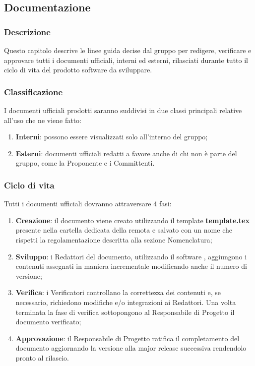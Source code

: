 \subsection{Documentazione}

	\subsubsection{Descrizione}
	Questo capitolo descrive le linee guida decise dal gruppo per redigere, verificare e approvare tutti i documenti ufficiali, interni ed esterni, rilasciati durante tutto il ciclo di vita del prodotto software da sviluppare.

	\subsubsection{Classificazione}
	I documenti ufficiali prodotti saranno suddivisi in due classi principali relative all'uso che ne viene fatto:
	\begin{enumerate}
		\item \textbf{Interni}: possono essere visualizzati solo all'interno del gruppo;
		\item \textbf{Esterni}: documenti ufficiali redatti a favore anche di chi non è parte del gruppo, come la Proponente e i Committenti.
	\end{enumerate}

	\subsubsection{Ciclo di vita}
	Tutti i documenti ufficiali dovranno attraversare 4 fasi:
	\begin{enumerate}
		\item \textbf{Creazione}: il documento viene creato utilizzando il template \textbf{template.tex} presente nella cartella dedicata della  remota e salvato con un nome che rispetti la regolamentazione descritta alla sezione Nomenclatura;
		\item \textbf{Sviluppo}: i Redattori del documento, utilizzando il software , aggiungono i contenuti assegnati in maniera incrementale modificando anche il numero di versione;
		\item \textbf{Verifica}: i Verificatori controllano la correttezza dei contenuti e, se necessario, richiedono modifiche e/o integrazioni ai Redattori. Una volta terminata la fase di verifica sottopongono al Responsabile di Progetto il documento verificato;
		\item \textbf{Approvazione}: il Responsabile di Progetto ratifica il completamento del documento aggiornando la versione alla major release successiva rendendolo pronto al rilascio.
	\end{enumerate}

